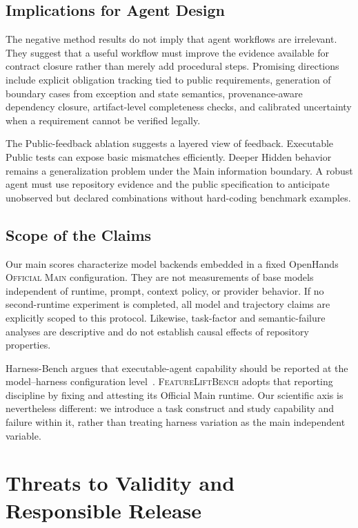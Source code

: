 \documentclass[acmsmall,anonymous,review,screen]{acmart}
\newcommand{\flb}{\textsc{FeatureLiftBench}\xspace}
\newcommand{\mainprotocol}{\textsc{Official Main}\xspace}
\begin{document}
\subsection{Implications for Agent Design}

The negative method results do not imply that agent workflows are irrelevant.
They suggest that a useful workflow must improve the evidence available for
contract closure rather than merely add procedural steps. Promising directions
include explicit obligation tracking tied to public requirements, generation
of boundary cases from exception and state semantics, provenance-aware
dependency closure, artifact-level completeness checks, and calibrated
uncertainty when a requirement cannot be verified legally.

The Public-feedback ablation suggests a layered view of feedback. Executable
Public tests can expose basic mismatches efficiently. Deeper Hidden behavior
remains a generalization problem under the Main information boundary. A robust
agent must use repository evidence and the public specification to anticipate
unobserved but declared combinations without hard-coding benchmark examples.

\subsection{Scope of the Claims}

Our main scores characterize model backends embedded in a fixed OpenHands
\mainprotocol configuration. They are not measurements of base models
independent of runtime, prompt, context policy, or provider behavior. If no
second-runtime experiment is completed, all model and trajectory claims are
explicitly scoped to this protocol. Likewise, task-factor and semantic-failure
analyses are descriptive and do not establish causal effects of repository
properties.

Harness-Bench argues that executable-agent capability should be reported at the
model--harness configuration level~\cite{yao2026harnessbench}. \flb adopts that
reporting discipline by fixing and attesting its Official Main runtime. Our
scientific axis is nevertheless different: we introduce a task construct and
study capability and failure within it, rather than treating harness variation
as the main independent variable.


\section{Threats to Validity and Responsible Release}
\label{sec:threats}
\end{document}
